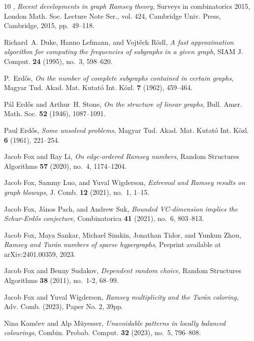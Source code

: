 \begin{thebibliography}{10}
\bysame, \emph{Recent developments in graph {R}amsey theory}, Surveys in
  combinatorics 2015, London Math. Soc. Lecture Note Ser., vol. 424, Cambridge
  Univ. Press, Cambridge, 2015, pp.~49--118. 

Richard~A. Duke, Hanno Lefmann, and Vojt\v{e}ch R\"{o}dl, \emph{A fast
  approximation algorithm for computing the frequencies of subgraphs in a given
  graph}, SIAM J. Comput. \textbf{24} (1995), no.~3, 598--620. 

P.~Erd\H{o}s, \emph{On the number of complete subgraphs contained in certain
  graphs}, Magyar Tud. Akad. Mat. Kutat\'{o} Int. K\"{o}zl. \textbf{7} (1962),
  459--464. 

P\'{a}l Erd\H{o}s and Arthur~H. Stone, \emph{On the structure of linear
  graphs}, Bull. Amer. Math. Soc. \textbf{52} (1946), 1087--1091. 

Paul Erd\H{o}s, \emph{Some unsolved problems}, Magyar Tud. Akad. Mat.
  Kutat\'{o} Int. K\"{o}zl. \textbf{6} (1961), 221--254. 

Jacob Fox and Ray Li, \emph{On edge-ordered {R}amsey numbers}, Random
  Structures Algorithms \textbf{57} (2020), no.~4, 1174--1204. 

Jacob Fox, Sammy Luo, and Yuval Wigderson, \emph{Extremal and {R}amsey results
  on graph blowups}, J. Comb. \textbf{12} (2021), no.~1, 1--15. 

Jacob Fox, J\'{a}nos Pach, and Andrew Suk, \emph{Bounded {VC}-dimension implies
  the {S}chur-{Erd\H{o}s} conjecture}, Combinatorica \textbf{41} (2021), no.~6,
  803--813. 

Jacob Fox, Maya Sankar, Michael Simkin, Jonathan Tidor, and Yunkun Zhou,
  \emph{{R}amsey and {T}ur\'{a}n numbers of sparse hypergraphs}, Preprint
  available at arXiv:2401.00359, 2023.

Jacob Fox and Benny Sudakov, \emph{Dependent random choice}, Random Structures
  Algorithms \textbf{38} (2011), no.~1-2, 68--99. 

Jacob Fox and Yuval Wigderson, \emph{Ramsey multiplicity and the {T}ur\'an
  coloring}, Adv. Comb. (2023), Paper No. 2, 39pp. 

Nina Kam\v{c}ev and Alp M\"{u}yesser, \emph{Unavoidable patterns in locally
  balanced colourings}, Combin. Probab. Comput. \textbf{32} (2023), no.~5,
  796--808. 


\end{thebibliography}
